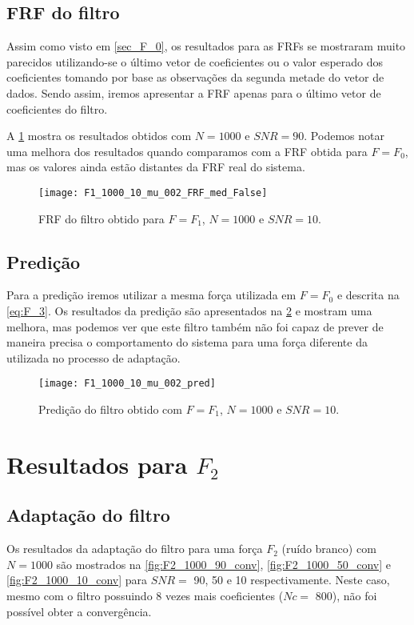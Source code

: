 \subsection{FRF do filtro}
Assim como visto em \ref{sec_F_0}, os resultados para as FRFs se mostraram muito parecidos utilizando-se o último vetor de coeficientes ou o valor esperado dos coeficientes tomando por base as observações da segunda metade do vetor de dados. Sendo assim, iremos apresentar a FRF apenas para o último vetor de coeficientes do filtro.

A \cref{fig:F1_1000_10_mu_002_FRF_med_False} mostra os resultados obtidos com $ N=1000 $ e $ SNR=90 $. Podemos notar uma melhora dos resultados quando comparamos com a FRF obtida para $ F=F_0 $, mas os valores ainda estão distantes da FRF real do sistema.

\begin{figure}
	\centering
	\texttt{[image: F1\_1000\_10\_mu\_002\_FRF\_med\_False]}
	\caption{FRF do filtro obtido para $ F=F_1 $, $ N=1000 $ e $ SNR=10 $.}
	\label{fig:F1_1000_10_mu_002_FRF_med_False}
\end{figure}

\subsection{Predição}

Para a predição iremos utilizar a mesma força utilizada em $ F=F_0 $ e descrita na \cref{eq:F_3}. Os resultados da predição são apresentados na \cref{fig:F1_1000_10_mu_002_pred} e mostram uma melhora, mas podemos ver que este filtro também não foi capaz de prever de maneira precisa o comportamento do sistema para uma força diferente da utilizada no processo de adaptação.

\begin{figure}[h]
	\centering
	\texttt{[image: F1\_1000\_10\_mu\_002\_pred]}
	\caption{Predição do filtro obtido com $ F=F_1 $, $ N=1000 $ e $ SNR=10 $.}
	\label{fig:F1_1000_10_mu_002_pred}
\end{figure}

\section{Resultados para $ F_2 $}
\subsection{Adaptação do filtro}

Os resultados da adaptação do filtro para uma força $ F_2 $ (ruído branco) com $ N=1000 $ são mostrados na \cref{fig:F2_1000_90_conv}, \cref{fig:F2_1000_50_conv} e \cref{fig:F2_1000_10_conv} para $ SNR = $ 90, 50 e 10  respectivamente. Neste caso, mesmo com o filtro possuindo 8 vezes mais coeficientes ($ Nc = $ 800), não foi possível obter a convergência.

